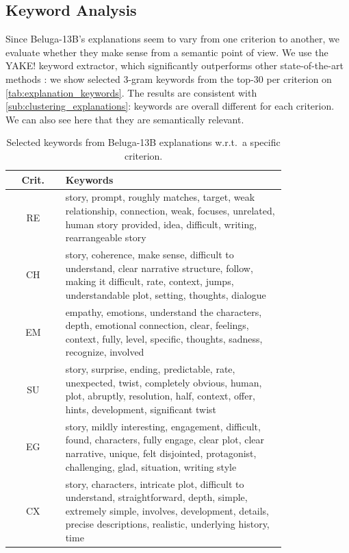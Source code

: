 \subsection{Keyword Analysis}
\label{sub:keyword_analysis}

Since Beluga-13B's explanations seem to vary from one criterion to another, we evaluate whether they make sense from a semantic point of view. We use the YAKE! keyword extractor, which significantly outperforms other state-of-the-art methods  \citep{campos2020yake}: we show selected 3-gram keywords from the top-30 per criterion on \autoref{tab:explanation_keywords}. The results are consistent with \autoref{sub:clustering_explanations}: keywords are overall different for each criterion. We can also see here that they are semantically relevant.

\begin{table}[!h]
\centering
\begin{tabular}{cp{0.8\linewidth}}
\toprule
\textbf{Crit.} & \textbf{Keywords}\\
\midrule
RE & story, prompt, roughly matches, target, weak relationship, connection, weak, focuses, unrelated, human story provided, idea, difficult, writing, rearrangeable story\\
\midrule
CH & story, coherence, make sense, difficult to understand, clear narrative structure, follow, making it difficult, rate, context, jumps, understandable plot, setting, thoughts, dialogue\\
\midrule
EM & empathy, emotions, understand the characters, depth, emotional connection, clear, feelings, context, fully, level, specific, thoughts, sadness, recognize, involved\\
\midrule
SU & story, surprise, ending, predictable, rate, unexpected, twist, completely obvious, human, plot, abruptly, resolution, half, context, offer, hints, development, significant twist\\
\midrule
EG & story, mildly interesting, engagement, difficult, found, characters, fully engage, clear plot, clear narrative, unique, felt disjointed, protagonist, challenging, glad, situation, writing style\\
\midrule
CX &  story, characters, intricate plot, difficult to understand, straightforward, depth, simple, extremely simple, involves, development, details, precise descriptions, realistic, underlying history, time\\
\bottomrule
\end{tabular}
\caption{Selected keywords from Beluga-13B explanations w.r.t.\ a specific criterion.}
\label{tab:explanation_keywords}
\end{table}

